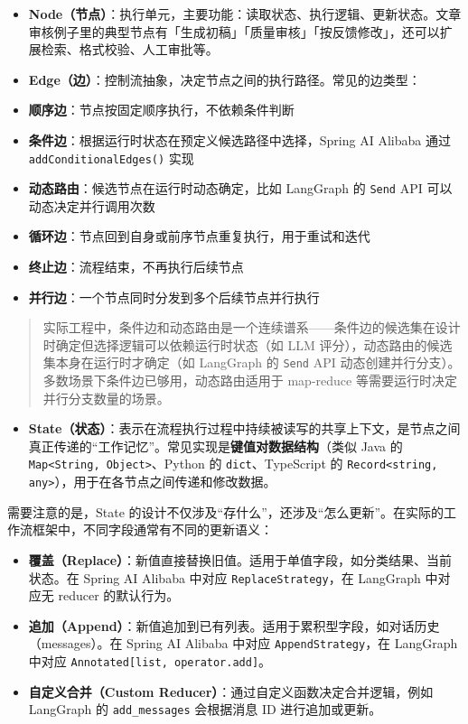 \documentclass[10pt,a4paper]{ctexart}
\begin{document}
\begin{itemize}[itemsep=2pt, topsep=4pt]
  \item \textbf{Node（节点）}：执行单元，主要功能：读取状态、执行逻辑、更新状态。文章审核例子里的典型节点有「生成初稿」「质量审核」「按反馈修改」，还可以扩展检索、格式校验、人工审批等。
  \item \textbf{Edge（边）}：控制流抽象，决定节点之间的执行路径。常见的边类型：
  \item \textbf{顺序边}：节点按固定顺序执行，不依赖条件判断
  \item \textbf{条件边}：根据运行时状态在预定义候选路径中选择，Spring AI Alibaba 通过 \texttt{addConditionalEdges()} 实现
  \item \textbf{动态路由}：候选节点在运行时动态确定，比如 LangGraph 的 \texttt{Send} API 可以动态决定并行调用次数
  \item \textbf{循环边}：节点回到自身或前序节点重复执行，用于重试和迭代
  \item \textbf{终止边}：流程结束，不再执行后续节点
  \item \textbf{并行边}：一个节点同时分发到多个后续节点并行执行
\end{itemize}


\begin{quote}
实际工程中，条件边和动态路由是一个连续谱系——条件边的候选集在设计时确定但选择逻辑可以依赖运行时状态（如 LLM 评分），动态路由的候选集本身在运行时才确定（如 LangGraph 的 \texttt{Send} API 动态创建并行分支）。多数场景下条件边已够用，动态路由适用于 map-reduce 等需要运行时决定并行分支数量的场景。
\end{quote}


\begin{itemize}[itemsep=2pt, topsep=4pt]
  \item \textbf{State（状态）}：表示在流程执行过程中持续被读写的共享上下文，是节点之间真正传递的“工作记忆”。常见实现是\textbf{键值对数据结构}（类似 Java 的 \texttt{Map<String, Object>}、Python 的 \texttt{dict}、TypeScript 的 \texttt{Record<string, any>}），用于在各节点之间传递和修改数据。
\end{itemize}


需要注意的是，State 的设计不仅涉及“存什么”，还涉及“怎么更新”。在实际的工作流框架中，不同字段通常有不同的更新语义：


\begin{itemize}[itemsep=2pt, topsep=4pt]
  \item \textbf{覆盖（Replace）}：新值直接替换旧值。适用于单值字段，如分类结果、当前状态。在 Spring AI Alibaba 中对应 \texttt{ReplaceStrategy}，在 LangGraph 中对应无 reducer 的默认行为。
  \item \textbf{追加（Append）}：新值追加到已有列表。适用于累积型字段，如对话历史（messages）。在 Spring AI Alibaba 中对应 \texttt{AppendStrategy}，在 LangGraph 中对应 \texttt{Annotated[list, operator.add]}。
  \item \textbf{自定义合并（Custom Reducer）}：通过自定义函数决定合并逻辑，例如 LangGraph 的 \texttt{add\_messages} 会根据消息 ID 进行追加或更新。
\end{itemize}
\end{document}
